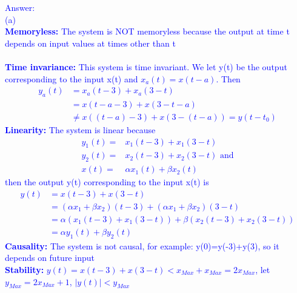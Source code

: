 \documentclass[12pt,a4paper]{article}
\begin{document}
\begin{tcolorbox}
\normalsize
\textcolor{blue}{Answer:\\
(a) \\
\textbf{Memoryless:} The system is NOT memoryless because the output at time t depends on input values at times other than t\\ \\
\textbf{Time invariance:} This system is time invariant. We let y(t) be the output corresponding to the input x(t) and $x_a(t)=x(t-a)$. Then
\begin{equation*}
    \begin{aligned}
        y_a(t)&=x_a(t-3)+x_a(3-t)\\
        &=x(t-a-3)+x(3-t-a)\\
        &\neq x((t-a)-3)+x(3-(t-a))=y(t-t_0)
    \end{aligned}
\end{equation*}
\textbf{Linearity:} The system is linear because
\begin{equation*}    
    \begin{aligned}
        y_1(t)=&x_1(t-3)+x_1(3-t)\\
        y_2(t)=&x_2(t-3)+x_2(3-t)\text{ and}\\
        x(t)=&\alpha x_1(t)+\beta x_2(t)
    \end{aligned}
\end{equation*}
then the output y(t) corresponding to the input x(t) is
\begin{equation*}
    \begin{aligned}
        y(t)&=x(t-3)+x(3-t)\\
        &=(\alpha x_1+\beta x_2)(t-3)+(\alpha x_1+\beta x_2)(3-t)\\
        &=\alpha(x_1(t-3)+x_1(3-t))+\beta(x_2(t-3)+x_2(3-t))\\
        &=\alpha y_1(t)+\beta y_2(t)
    \end{aligned}
\end{equation*}
\textbf{Causality:} The system is not causal, for example: y(0)=y(-3)+y(3), so it depends on future input\\
\textbf{Stability:} $y(t)=x(t-3)+x(3-t)<x_{Max}+x_{Max}=2x_{Max}$, let $y_{Max}=2x_{Max}+1$, $|y(t)|<y_{Max}$
}
\end{tcolorbox}
\end{document}
